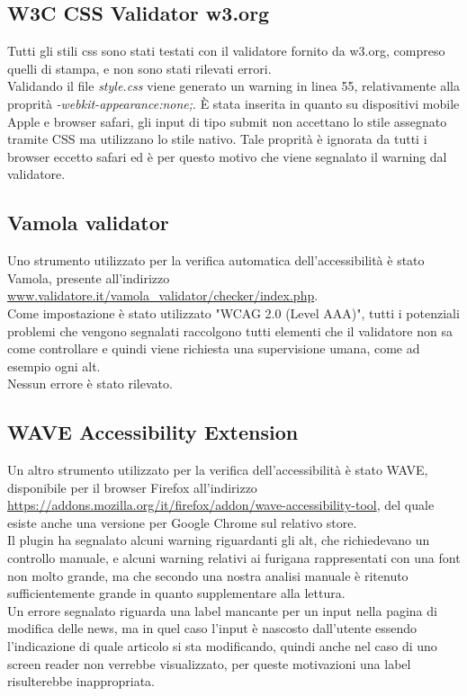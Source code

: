 \documentclass[openany, a4paper, 12pt]{report}
\begin{document}
			\subsection{W3C CSS Validator w3.org}
				Tutti gli stili css sono stati testati con il validatore fornito da w3.org, compreso quelli di stampa, e non sono stati rilevati errori.\\
				Validando il file \textit{style.css} viene generato un warning in linea 55, relativamente alla proprità \textit{-webkit-appearance:none;}. È stata inserita in quanto su dispositivi mobile Apple e browser safari, gli input di tipo submit non accettano lo stile assegnato tramite CSS ma utilizzano lo stile nativo. Tale proprità è ignorata da tutti i browser eccetto safari ed è per questo motivo che viene segnalato il warning dal validatore.
			\subsection{Vamola validator}
				Uno strumento utilizzato per la verifica automatica dell'accessibilità è stato Vamola, presente all'indirizzo \url{www.validatore.it/vamola_validator/checker/index.php}.\\
				Come impostazione è stato utilizzato "WCAG 2.0 (Level AAA)", tutti i potenziali problemi che vengono segnalati raccolgono tutti elementi che il validatore non sa come controllare e quindi viene richiesta una supervisione umana, come ad esempio ogni alt.\\
				Nessun errore è stato rilevato.
			\subsection{WAVE Accessibility Extension}
				Un altro strumento utilizzato per la verifica dell'accessibilità è stato WAVE, disponibile per il browser Firefox all'indirizzo \url{https://addons.mozilla.org/it/firefox/addon/wave-accessibility-tool}, del quale esiste anche una versione per Google Chrome sul relativo store.\\
				Il plugin ha segnalato alcuni warning riguardanti gli alt, che richiedevano un controllo manuale, e alcuni warning relativi ai furigana rappresentati con una font non molto grande, ma che secondo una nostra analisi manuale è ritenuto sufficientemente grande in quanto supplementare alla lettura.\\
				Un errore segnalato riguarda una label mancante per un input nella pagina di modifica delle news, ma in quel caso l'input è nascosto dall'utente essendo l'indicazione di quale articolo si sta modificando, quindi anche nel caso di uno screen reader non verrebbe visualizzato, per queste motivazioni una label risulterebbe inappropriata.
\end{document}
